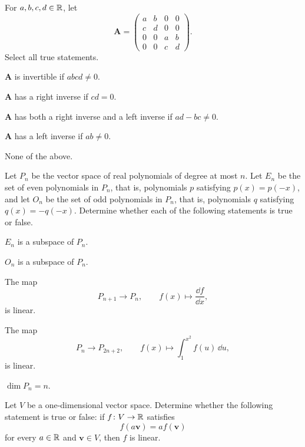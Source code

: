 \documentclass[11pt,oneside]{article}
\begin{document}
\begin{problem}
For $a,b,c,d\in\mathbb{R}$, let
\[
\mathbf A=
\begin{pmatrix}
a&b&0&0\\
c&d&0&0\\
0&0&a&b\\
0&0&c&d
\end{pmatrix}.
\]
Select all true statements.
\begin{problemchoices}
\item $\mathbf A$ is invertible if $abcd\ne0$.
\item $\mathbf A$ has a right inverse if $cd=0$.
\item $\mathbf A$ has both a right inverse and a left inverse if $ad-bc\ne0$.
\item $\mathbf A$ has a left inverse if $ab\ne0$.
\item None of the above.
\end{problemchoices}
\end{problem}

\begin{problem}
Let $P_n$ be the vector space of real polynomials of degree at most $n$. Let $E_n$ be the set of even polynomials in $P_n$, that is, polynomials $p$ satisfying $p(x)=p(-x)$, and let $O_n$ be the set of odd polynomials in $P_n$, that is, polynomials $q$ satisfying $q(x)=-q(-x)$. Determine whether each of the following statements is true or false.
\begin{problemchoices}
\item $E_n$ is a subspace of $P_n$.
\item $O_n$ is a subspace of $P_n$.
\item The map
\[
P_{n+1}\to P_n,
\qquad
f(x)\mapsto \frac{\dd f}{\dd x},
\]
is linear.
\item The map
\[
P_n\to P_{2n+2},
\qquad
f(x)\mapsto \int_1^{x^2}f(u)\,\dd u,
\]
is linear.
\item $\dim P_n=n$.
\end{problemchoices}
\end{problem}

\begin{problem}
Let $V$ be a one-dimensional vector space. Determine whether the following statement is true or false: if $f\colon V\to\mathbb{R}$ satisfies
\[
f(a\mathbf v)=a f(\mathbf v)
\]
for every $a\in\mathbb{R}$ and $\mathbf v\in V$, then $f$ is linear.
\end{problem}
\end{document}
